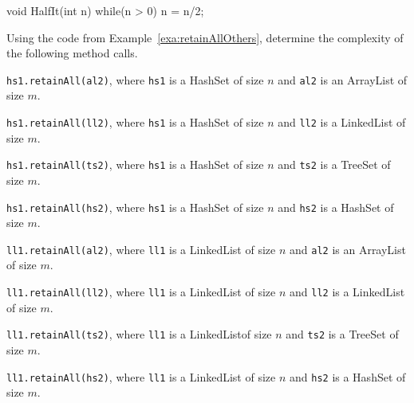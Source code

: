 \begin{pro}
\begin{lenum}
\item
\begin{code}
void HalfIt(int n) {
    while(n > 0) {
        n = n/2;
    }
}
\end{code}
\end{lenum}
\end{pro}

\begin{pro}
Using the code from Example~\ref{exa:retainAllOthers}, 
determine the complexity of the following method calls.
\begin{lenum}
\item
\verb+hs1.retainAll(al2)+, 
where \verb+hs1+ is a HashSet of size $n$ and \verb+al2+ is an ArrayList of size $m$.
\item
\verb+hs1.retainAll(ll2)+, 
where \verb+hs1+ is a HashSet of size $n$ and \verb+ll2+ is a LinkedList of size $m$.
\item
\verb+hs1.retainAll(ts2)+, 
where \verb+hs1+ is a HashSet of size $n$ and \verb+ts2+ is a TreeSet of size $m$.
\item
\verb+hs1.retainAll(hs2)+, 
where \verb+hs1+ is a HashSet of size $n$ and \verb+hs2+ is a HashSet of size $m$.


\item
\verb+ll1.retainAll(al2)+, 
where \verb+ll1+ is a LinkedList of size $n$ and \verb+al2+ is an ArrayList of size $m$.
\item
\verb+ll1.retainAll(ll2)+, 
where \verb+ll1+ is a LinkedList of size $n$ and \verb+ll2+ is a LinkedList of size $m$.
\item
\verb+ll1.retainAll(ts2)+, 
where \verb+ll1+ is a LinkedListof size $n$ and \verb+ts2+ is a TreeSet of size $m$.
\item
\verb+ll1.retainAll(hs2)+, 
where \verb+ll1+ is a LinkedList of size $n$ and \verb+hs2+ is a HashSet of size $m$.
\end{lenum}
\end{pro}

\newpage

